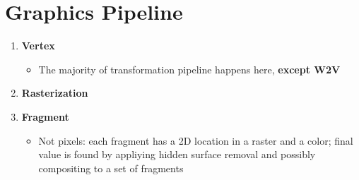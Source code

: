 \section{Graphics Pipeline}

  \begin{enumerate}
    \item \textbf{Vertex}
    \begin{itemize}
      \item The majority of transformation pipeline happens here,
      \textbf{except W2V}
    \end{itemize}
    \item \textbf{Rasterization}
    \item \textbf{Fragment}
    \begin{itemize}
      \item Not pixels: each fragment has a 2D location in a raster and a color;
      final value is found by appliying hidden surface removal and possibly
      compositing to a set of fragments
    \end{itemize}
  \end{enumerate}
